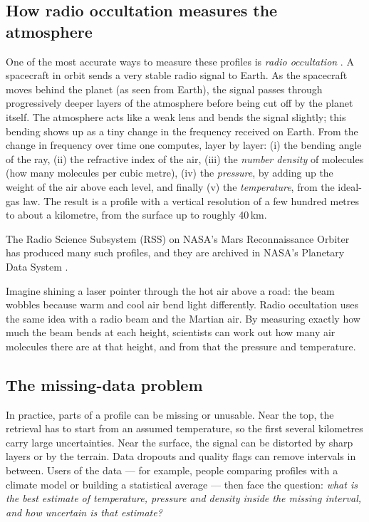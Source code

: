 \documentclass[11pt,a4paper]{article}
\begin{document}
\subsection{How radio occultation measures the atmosphere}
One of the most accurate ways to measure these profiles is \emph{radio occultation} \citep{fjeldbo1971,kursinski1997,hinson1999}. A spacecraft in orbit sends a very stable radio signal to Earth. As the spacecraft moves behind the planet (as seen from Earth), the signal passes through progressively deeper layers of the atmosphere before being cut off by the planet itself. The atmosphere acts like a weak lens and bends the signal slightly; this bending shows up as a tiny change in the frequency received on Earth. From the change in frequency over time one computes, layer by layer: (i) the bending angle of the ray, (ii) the refractive index of the air, (iii) the \emph{number density} of molecules (how many molecules per cubic metre), (iv) the \emph{pressure}, by adding up the weight of the air above each level, and finally (v) the \emph{temperature}, from the ideal-gas law. The result is a profile with a vertical resolution of a few hundred metres to about a kilometre, from the surface up to roughly 40\,km.

The Radio Science Subsystem (RSS) on NASA's Mars Reconnaissance Orbiter \citep{zurek2007} has produced many such profiles, and they are archived in NASA's Planetary Data System \citep{hinsonPDS}.

\begin{plainbox}
Imagine shining a laser pointer through the hot air above a road: the beam wobbles because warm and cool air bend light differently. Radio occultation uses the same idea with a radio beam and the Martian air. By measuring exactly how much the beam bends at each height, scientists can work out how many air molecules there are at that height, and from that the pressure and temperature.
\end{plainbox}

\subsection{The missing-data problem}
In practice, parts of a profile can be missing or unusable. Near the top, the retrieval has to start from an assumed temperature, so the first several kilometres carry large uncertainties. Near the surface, the signal can be distorted by sharp layers or by the terrain. Data dropouts and quality flags can remove intervals in between. Users of the data --- for example, people comparing profiles with a climate model or building a statistical average --- then face the question: \emph{what is the best estimate of temperature, pressure and density inside the missing interval, and how uncertain is that estimate?}
\end{document}
